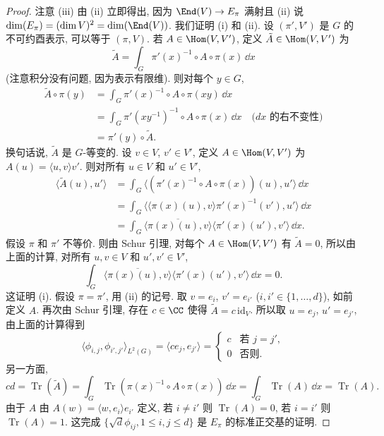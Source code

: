 \begin{proof}
注意 (iii) 由 (ii) 立即得出, 因为 $\End(V) \to E_{\pi}$ 满射且 (ii) 说 $\dim(E_{\pi}) = (\dim V)^2 = \dim(\End(V))$.
我们证明 (i) 和 (ii). 设 $(\pi', V')$ 是 $G$ 的不可约酉表示, 可以等于 $(\pi, V)$. 若 $A \in \Hom(V, V')$, 定义 $\tilde{A} \in \Hom(V, V')$ 为
\[
\tilde{A} = \int_G \pi'(x)^{-1} \circ A \circ \pi(x)\,\dd x
\]
(注意积分没有问题, 因为表示有限维). 则对每个 $y \in G$,
\begin{align*}
\tilde{A} \circ \pi(y) &= \int_G \pi'(x)^{-1} \circ A \circ \pi(xy)\,\dd x \\
&= \int_G \pi'(xy^{-1})^{-1} \circ A \circ \pi(x)\,\dd x \quad \text{($dx$ 的右不变性)} \\
&= \pi'(y) \circ \tilde{A}.
\end{align*}
换句话说, $\tilde{A}$ 是 $G$-等变的.
设 $v \in V$, $v' \in V'$, 定义 $A \in \Hom(V, V')$ 为 $A(u) = \langle u, v \rangle v'$. 则对所有 $u \in V$ 和 $u' \in V'$,
\begin{align*}
\langle \tilde{A}(u), u' \rangle &= \int_G \langle (\pi'(x)^{-1} \circ A \circ \pi(x))(u), u' \rangle\,\dd x \\
&= \int_G \langle \langle \pi(x)(u), v \rangle\pi'(x)^{-1}(v'), u' \rangle\,\dd x \\
&= \int_G \overline{\langle \pi(x)(u), v \rangle}\langle \pi'(x)(u'), v' \rangle\,\dd x.
\end{align*}
假设 $\pi$ 和 $\pi'$ 不等价. 则由 Schur 引理, 对每个 $A \in \Hom(V, V')$ 有 $\tilde{A} = 0$, 所以由上面的计算, 对所有 $u, v \in V$ 和 $u', v' \in V'$,
\[
\int_G \overline{\langle \pi(x)(u), v \rangle}\langle \pi'(x)(u'), v' \rangle\,\dd x = 0.
\]
这证明 (i).
假设 $\pi = \pi'$, 用 (ii) 的记号. 取 $v = e_i$, $v' = e_{i'}$ ($i, i' \in \{1, \ldots, d\}$), 如前定义 $A$. 再次由 Schur 引理, 存在 $c \in \CC$ 使得 $\tilde{A} = c\,\mathrm{id}_V$. 所以取 $u = e_j$, $u' = e_{j'}$, 由上面的计算得到
\[
\langle \phi_{i,j}, \phi_{i',j'} \rangle_{L^2(G)} = \langle ce_j, e_{j'} \rangle = \begin{cases} c & \text{若 } j = j', \\ 0 & \text{否则}. \end{cases}
\]
另一方面,
\[
cd = \operatorname{Tr}(\tilde{A}) = \int_G \operatorname{Tr}(\pi(x)^{-1} \circ A \circ \pi(x))\,\dd x = \int_G \operatorname{Tr}(A)\,\dd x = \operatorname{Tr}(A).
\]
由于 $A$ 由 $A(w) = \langle w, e_i \rangle e_{i'}$ 定义, 若 $i \neq i'$ 则 $\operatorname{Tr}(A) = 0$, 若 $i = i'$ 则 $\operatorname{Tr}(A) = 1$. 这完成 $\{\sqrt{d}\phi_{ij}, 1 \leq i, j \leq d\}$ 是 $E_{\pi}$ 的标准正交基的证明.
\end{proof}

